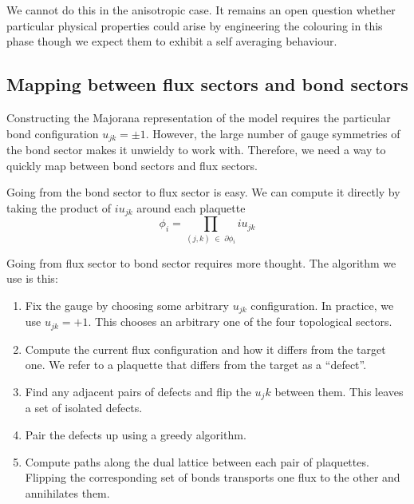 We cannot do this in the anisotropic case. It remains an open question whether particular physical properties could arise by engineering the colouring in this phase though we expect them to exhibit a self averaging behaviour.

\hypertarget{mapping-between-flux-sectors-and-bond-sectors}{%
\subsection{Mapping between flux sectors and bond sectors}\label{mapping-between-flux-sectors-and-bond-sectors}}

Constructing the Majorana representation of the model requires the particular bond configuration \(u_{jk} = \pm 1\). However, the large number of gauge symmetries of the bond sector makes it unwieldy to work with. Therefore, we need a way to quickly map between bond sectors and flux sectors.

Going from the bond sector to flux sector is easy. We can compute it directly by taking the product of \(i u_{jk}\) around each plaquette \[ \phi_i = \prod_{(j,k) \; \in \; \partial \phi_i} i u_{jk}\]

Going from flux sector to bond sector requires more thought. The algorithm we use is this:

\begin{enumerate}
\def\labelenumi{\arabic{enumi}.}
\item
  Fix the gauge by choosing some arbitrary \(u_{jk}\) configuration. In practice, we use \(u_{jk} = +1\). This chooses an arbitrary one of the four topological sectors.
\item
  Compute the current flux configuration and how it differs from the target one. We refer to a plaquette that differs from the target as a ``defect''.
\item
  Find any adjacent pairs of defects and flip the \(u_jk\) between them. This leaves a set of isolated defects.
\item
  Pair the defects up using a greedy algorithm.
\item
  Compute paths along the dual lattice between each pair of plaquettes. Flipping the corresponding set of bonds transports one flux to the other and annihilates them.
\end{enumerate}

